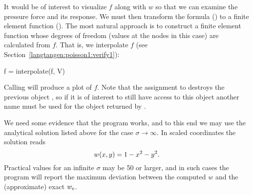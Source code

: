It would be of interest to visualize $f$ along with $w$ so that we can
examine the pressure force and its response.  We must then transform
the formula () to a finite element function
().  The most natural approach is to construct a finite
element function whose degrees of freedom (values at the nodes in this case)
are calculated from $f$. That is, we interpolate $f$ (see
Section~\ref{langtangen:poisson1:verify1}):
\begin{python}
f = interpolate(f, V)
\end{python}
Calling  will produce a plot of $f$. Note that the assignment
to  destroys the previous  object , so if
it is of interest to still have access to this object another name must be used
for the  object returned by .

We need some evidence that the program works, and to this end we may
use the analytical solution listed above for the case
$\sigma\rightarrow\infty$. In scaled coordinates the solution reads
\[ w_{\rm}(x,y) = 1-x^2-y^2 .\]
Practical values for an infinite $\sigma$
may be 50 or larger, and in such cases the program will report the
maximum deviation between the computed $w$ and the (approximate) exact
$w_{\rm e}$.

